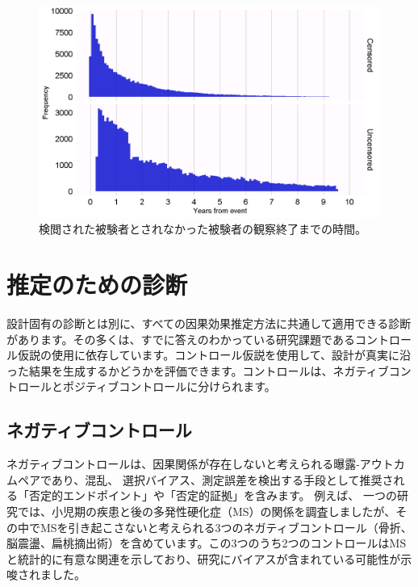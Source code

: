 \documentclass[
  11pt]{book}
\theoremstyle{definition}
\theoremstyle{definition}
\theoremstyle{definition}
\theoremstyle{definition}
\theoremstyle{remark}
\begin{document}
\begin{figure}

{\centering \includegraphics[width=1\linewidth]{images/MethodValidity/timeToObsEnd} 

}

\caption{検閲された被験者とされなかった被験者の観察終了までの時間。}\label{fig:timeToObsEnd}
\end{figure}

\section{推定のための診断}\label{ux63a8ux5b9aux306eux305fux3081ux306eux8a3aux65ad}

設計固有の診断とは別に、すべての因果効果推定方法に共通して適用できる診断があります。その多くは、すでに答えのわかっている研究課題であるコントロール仮説の使用に依存しています。コントロール仮説を使用して、設計が真実に沿った結果を生成するかどうかを評価できます。コントロールは、ネガティブコントロールとポジティブコントロールに分けられます。

\subsection{ネガティブコントロール}\label{NegativeControls}


ネガティブコントロールは、因果関係が存在しないと考えられる曝露-アウトカムペアであり、混乱、\citep{lipsitch_2010} 選択バイアス、測定誤差を検出する手段として推奨される「否定的エンドポイント」や「否定的証拠」を含みます。\citep{arnold_2016} 例えば、\citep{zaadstra_2008} 一つの研究では、小児期の疾患と後の多発性硬化症（MS）の関係を調査しましたが、その中でMSを引き起こさないと考えられる3つのネガティブコントロール（骨折、脳震盪、扁桃摘出術）を含めています。この3つのうち2つのコントロールはMSと統計的に有意な関連を示しており、研究にバイアスが含まれている可能性が示唆されました。
\end{document}
